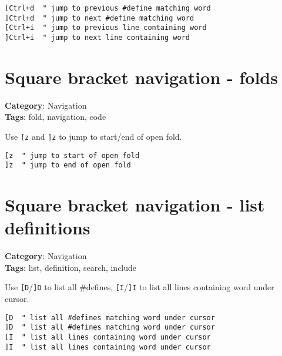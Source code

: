 {{{{{{{{{{\begin{Exa*}{}
\begin{Verbatim}[fontsize=\footnotesize, breaklines, breakanywhere]
[Ctrl+d  " jump to previous #define matching word
]Ctrl+d  " jump to next #define matching word
[Ctrl+i  " jump to previous line containing word
]Ctrl+i  " jump to next line containing word
\end{Verbatim}
\end{Exa*}

\section{Square bracket navigation - folds}

\textbf{Category}: Navigation\\ \textbf{Tags}: fold, navigation, code
\vspace{0.5cm}

Use {\footnotesize \Verb§[z§} and {\footnotesize \Verb§]z§} to jump to start/end of open fold.

\begin{Exa*}{}
\begin{Verbatim}[fontsize=\footnotesize, breaklines, breakanywhere]
[z  " jump to start of open fold
]z  " jump to end of open fold
\end{Verbatim}
\end{Exa*}

\section{Square bracket navigation - list definitions}

\textbf{Category}: Navigation\\ \textbf{Tags}: list, definition, search, include
\vspace{0.5cm}

Use {\footnotesize \Verb§[D§}/{\footnotesize \Verb§]D§} to list all \#defines, {\footnotesize \Verb§[I§}/{\footnotesize \Verb§]I§} to list all lines containing word under cursor.

\begin{Exa*}{}
\begin{Verbatim}[fontsize=\footnotesize, breaklines, breakanywhere]
[D  " list all #defines matching word under cursor
]D  " list all #defines matching word under cursor  
[I  " list all lines containing word under cursor
]I  " list all lines containing word under cursor
\end{Verbatim}
\end{Exa*}

}}}}}}}}}}

